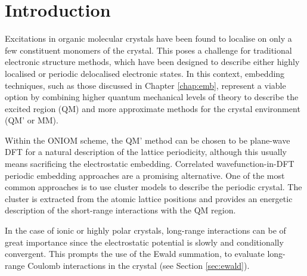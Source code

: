 \section{Introduction}




Excitations in organic molecular crystals have been found to localise on only a few constituent monomers of the crystal.\cite{Arag2015} This poses a challenge for traditional electronic structure methods, which have been designed to describe either highly localised or periodic delocalised electronic states. In this context, embedding techniques, such as those discussed in Chapter \ref{chap:emb}, represent a viable option by combining higher quantum mechanical levels of theory to describe the excited region (QM) and more approximate methods for the crystal environment (QM' or MM).\cite{SeveroPereiraGomes2012a} 

Within the ONIOM scheme, the QM' method can be chosen to be plane-wave DFT\cite{Kochman2013,Kochman2013a} for a natural description of the lattice periodicity, although this usually means sacrificing the electrostatic embedding. Correlated wavefunction-in-DFT periodic embedding approaches are a promising alternative\cite{Libisch2014,Cheng2017,Cheng2017a}. One of the most common approaches is to use cluster models to describe the periodic crystal.\cite{Presti2014,Presti2016a,Presti2016} The cluster is extracted from the atomic lattice positions and provides an energetic description of the short-range interactions with the QM region.

In the case of ionic or highly polar crystals, long-range interactions can be of great importance since the electrostatic potential is slowly and conditionally convergent. This prompts the use of the Ewald summation, to evaluate long-range Coulomb interactions in the crystal (see Section \ref{sec:ewald}).

